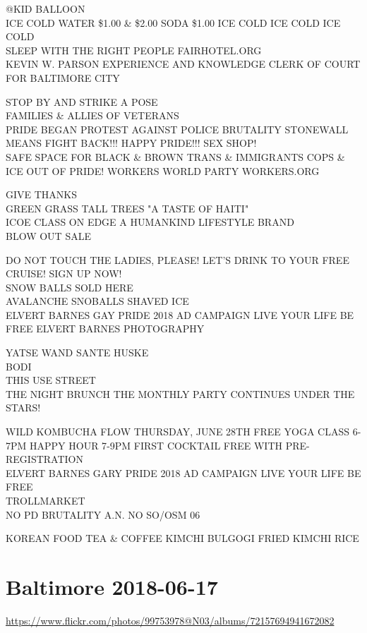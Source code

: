 \documentclass[10pt,letterpaper]{article}
\begin{document}
@KID BALLOON\\
ICE COLD WATER \$1.00 \& \$2.00 SODA \$1.00 ICE COLD ICE COLD ICE COLD\\
SLEEP WITH THE RIGHT PEOPLE FAIRHOTEL.ORG\\
KEVIN W. PARSON EXPERIENCE AND KNOWLEDGE CLERK OF COURT FOR BALTIMORE CITY

STOP BY AND STRIKE A POSE\\
FAMILIES \& ALLIES OF VETERANS\\
PRIDE BEGAN PROTEST AGAINST POLICE BRUTALITY STONEWALL MEANS FIGHT BACK!!! HAPPY PRIDE!!! SEX SHOP!\\
SAFE SPACE FOR BLACK \& BROWN TRANS \& IMMIGRANTS COPS \& ICE OUT OF PRIDE!  WORKERS WORLD PARTY WORKERS.ORG

GIVE THANKS\\
GREEN GRASS TALL TREES "A TASTE OF HAITI"\\
ICOE CLASS ON EDGE A HUMANKIND LIFESTYLE BRAND\\
BLOW OUT SALE

DO NOT TOUCH THE LADIES, PLEASE!  LET'S DRINK TO YOUR FREE CRUISE!  SIGN UP NOW!\\
SNOW BALLS SOLD HERE\\
AVALANCHE SNOBALLS SHAVED ICE\\
ELVERT BARNES GAY PRIDE 2018 AD CAMPAIGN LIVE YOUR LIFE BE FREE ELVERT BARNES PHOTOGRAPHY

YATSE WAND SANTE HUSKE\\
BODI\\
THIS USE STREET\\
THE NIGHT BRUNCH THE MONTHLY PARTY CONTINUES UNDER THE STARS!

WILD KOMBUCHA FLOW THURSDAY, JUNE 28TH FREE YOGA CLASS 6{-}7PM HAPPY HOUR 7{-}9PM FIRST COCKTAIL FREE WITH PRE{-}REGISTRATION\\
ELVERT BARNES GARY PRIDE 2018 AD CAMPAIGN LIVE YOUR LIFE BE FREE\\
TROLLMARKET\\
NO PD BRUTALITY A.N. NO SO/OSM 06

KOREAN FOOD TEA \& COFFEE KIMCHI BULGOGI FRIED KIMCHI RICE
\pagebreak

\section*{Baltimore 2018-06-17}

\url{https://www.flickr.com/photos/99753978@N03/albums/72157694941672082}
\end{document}
